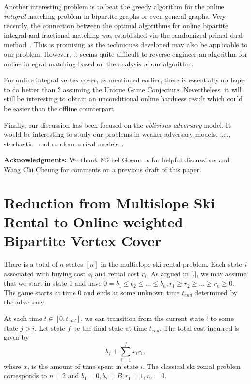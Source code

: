 \documentclass{article}
\begin{document}
Another interesting problem is to beat the greedy algorithm for the online {\em integral} matching problem in bipartite graphs or even general graphs. Very recently, the connection between the optimal algorithms for online bipartite integral and fractional matching was established via the randomized primal-dual method~\cite{devanurrandomized}. This is promising as the techniques developed may also be applicable to our problem. However, it seems quite difficult to reverse-engineer an algorithm for online integral matching based on the analysis of our algorithm.


For online integral vertex cover, as mentioned earlier, there is essentially no hope to do better than 2 assuming the Unique Game Conjecture. Nevertheless, it will still be interesting to obtain an unconditional online hardness result which could be easier than the offline counterpart.

Finally, our discussion has been focused on the {\em oblivious adversary} model. It would be interesting to study our problems in weaker adversary models, i.e., stochastic~\cite{Feldman2009,Manshadi2011} and random arrival models~\cite{Mahdian2011,Karande2011}.


{\noindent \bf Acknowledgments:}  We thank Michel Goemans for helpful discussions and Wang Chi Cheung for comments on a previous draft of this paper.




\clearpage{}\appendix

\section{Reduction from Multislope Ski Rental to Online weighted Bipartite Vertex Cover}
\label{sec:multislope}
There is a total of $n$ states $[n]$ in the multislope ski rental problem. Each state $i$ associated with buying cost $b_i$ and rental cost $r_i$. As argued in [.], we may assume that we start in state 1 and have $0=b_1\leq b_2\leq \ldots\leq b_n, r_1\geq r_2\geq \ldots\geq r_n\geq 0$. The game starts at time 0 and ends at some unknown time $t_{end}$ determined by the adversary.

At each time $t\in [0,t_{end}]$, we can transition from the current state $i$ to some state $j>i$. Let state $f$ be the final state at time $t_{end}$. The total cost incurred is given by $$b_f+\sum_{i=1}^f x_i r_i,$$where $x_i$ is the amount of time spent in state $i$. The classical ski rental problem corresponds to $n=2$ and $b_1=0,b_2=B,r_1=1,r_2=0$.
\end{document}
